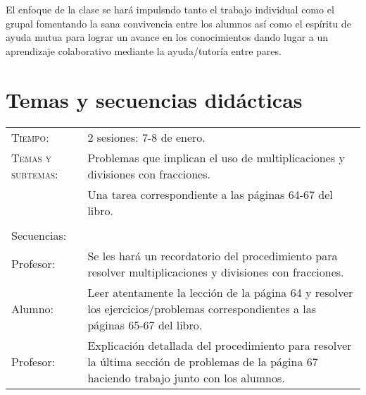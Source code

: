 \documentclass[letterpaper,10pt]{article}
\begin{document}
\vspace{5mm}

El enfoque de la clase se har\'a impulsndo tanto el trabajo individual como el 
grupal fomentando la sana convivencia entre los alumnos as\'i como el esp\'iritu
de ayuda mutua para lograr un avance en los conocimientos dando lugar a un 
aprendizaje colaborativo mediante la ayuda/tutor\'ia entre pares.

\vspace{5mm}

\section{Temas  y secuencias did\'acticas}
\begin{tabular}[t]{R{0.25\textwidth}p{0.71\textwidth}}
    \textsc{Tiempo:}                    & 2 sesiones: 7-8 de enero. \\
    \textsc{Temas y subtemas:}          & Problemas que implican el uso de multiplicaciones y divisiones con fracciones.\\
              & Una tarea correspondiente a las 
    p\'aginas 64-67 del libro. \\ \\
    \large{\sc Secuencias:} \\
    Profesor:   & Se les har\'a un recordatorio del procedimiento para resolver 
    multiplicaciones y divisiones con fracciones. \\
    Alumno:     & Leer atentamente la lecci\'on de la p\'agina 64 y resolver los 
    ejercicios/problemas correspondientes a las p\'aginas 65-67 del libro. \\
    Profesor: & Explicación detallada del procedimiento para resolver la \'ultima
    secci\'on de problemas de la p\'agina 67 haciendo trabajo junto con los 
    alumnos.

\end{tabular}
\end{document}
